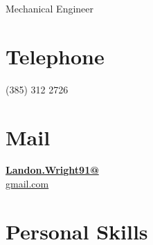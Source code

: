 \documentclass[]{friggeri-cv}
\begin{document}
      {Mechanical Engineer}


\begin{aside}
	\vspace{0.65 in}{~}
  \section{Telephone}
    (385) 312 2726
    ~
  \section{Mail}
    \href{mailto:landon.Wright91+resume@Gmail.com}{\textbf{Landon.Wright91@}\\gmail.com}
    ~
  \section{Personal Skills}
    ~

\end{aside}
\end{document}
